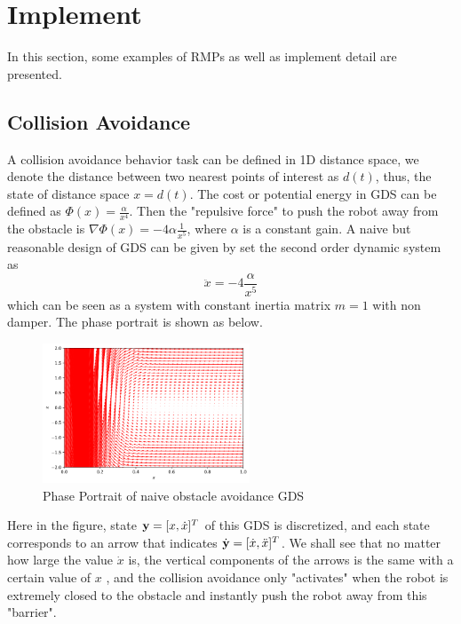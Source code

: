 \chapter{Implement}
In this section, some examples of RMPs as well as implement detail are presented.
\section{Collision Avoidance}
A collision avoidance behavior task can be defined in 1D distance space, we denote the distance between two nearest points of interest as $d(t)$, thus, the state of distance space $x = d(t)$.
The cost or potential energy in GDS can be defined as $\Phi(x) = \frac{\alpha}{x^4}$. Then the "repulsive force" to push the robot away from the obstacle is $\nabla\Phi(x)=-4{\alpha}\frac{1}{x^5}$, where $\alpha$ is a constant gain. A naive but reasonable design of GDS can be given by set the second order dynamic system as 
\begin{equation}
\ddot{x} = - 4\frac{\alpha}{x^5}
\end{equation}
which can be seen as a system with constant inertia matrix $m = 1$ with non damper.  The phase portrait is shown as below.

\begin{figure}
\centering
\includegraphics[width=0.55\textwidth]{Images/Chapter5/phase_portrait_obs_naive.png}
\caption{Phase Portrait of naive obstacle avoidance GDS}
\label{fig:chapter5_phase_portrait_obs_naive}
\end{figure}

Here in the figure, state $\mathbf{y} = [x, \dot{x}]^T$ of this GDS is discretized, and each state corresponds to an arrow that indicates ${\dot{\mathbf{y}}} = [\dot{x}, \ddot{x}]^T$. We shall see that no matter how large the value $\dot{x}$ is, the vertical components of the arrows is the same with a certain value of $x$ , and the collision avoidance only "activates" when the robot is extremely closed to the obstacle and instantly push the robot away from this "barrier". 

